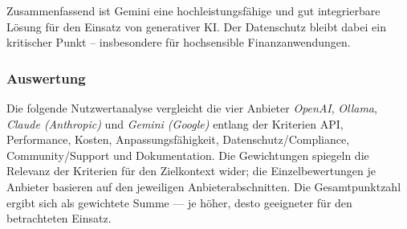       Zusammenfassend ist Gemini eine hochleistungsfähige und gut integrierbare Lösung für den Einsatz von generativer \acs{KI}.
      Der Datenschutz bleibt dabei ein kritischer Punkt – insbesondere für hochsensible Finanzanwendungen.

      \global\def\VAlternativeAPI          {3}
      \global\def\VAlternativePerformance  {3}
      \global\def\VAlternativeKosten       {1}
      \global\def\VAlternativeAnpassung    {2}
      \global\def\VAlternativeDatenschutz  {1}
      \global\def\VAlternativeSupport      {3}
      \global\def\VAlternativeDokumentation{3}

    \subsubsection{Auswertung}

      Die folgende Nutzwertanalyse vergleicht die vier Anbieter \emph{OpenAI}, \emph{Ollama}, \emph{Claude (Anthropic)} und \emph{Gemini (Google)} entlang der Kriterien \acs{API}, Performance, Kosten, Anpassungsfähigkeit, Datenschutz/Compliance, Community/Support und Dokumentation.
      Die Gewichtungen spiegeln die Relevanz der Kriterien für den Zielkontext wider; die Einzelbewertungen je Anbieter basieren auf den jeweiligen Anbieterabschnitten.
      Die Gesamtpunktzahl ergibt sich als gewichtete Summe — je höher, desto geeigneter für den betrachteten Einsatz.


